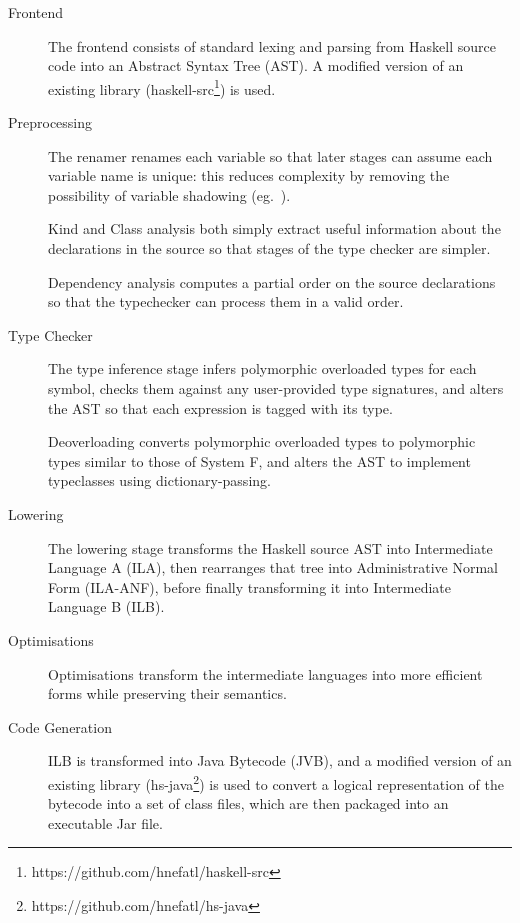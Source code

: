 \documentclass[dissertation.tex]{subfiles}
\begin{document}
\begin{description}
\item[Frontend]
{
    \hfill

    The frontend consists of standard lexing and parsing from Haskell source code into an Abstract Syntax Tree
    (AST). A modified version of an existing library (haskell-src\footnote{https://github.com/hnefatl/haskell-src})
    is used.

}
\item[Preprocessing]
{
    \hfill

    The renamer renames each variable so that later stages can assume each variable name is unique: this reduces
    complexity by removing the possibility of variable shadowing (eg.\ ).

    Kind and Class analysis both simply extract useful information about the declarations in the source so that stages
    of the type checker are simpler.

    Dependency analysis computes a partial order on the source declarations so that the typechecker can process them in
    a valid order.

}
\item[Type Checker]
{
    \hfill

    The type inference stage infers polymorphic overloaded types for each symbol, checks them against any user-provided
    type signatures, and alters the AST so that each expression is tagged with its type.

    Deoverloading converts polymorphic overloaded types to polymorphic types similar to those of System F, and alters
    the AST to implement typeclasses using dictionary-passing.

}
\item[Lowering]
{
    \hfill

    The lowering stage transforms the Haskell source AST into Intermediate Language A (ILA), then rearranges that tree
    into Administrative Normal Form (ILA-ANF), before finally transforming it into Intermediate Language B (ILB).

}
\item[Optimisations]
{
    \hfill

    Optimisations transform the intermediate languages into more efficient forms while preserving their semantics.


}
\item[Code Generation]
{
    \hfill

    ILB is transformed into Java Bytecode (JVB), and a modified version of an existing library
    (hs-java\footnote{https://github.com/hnefatl/hs-java}) is used to convert a logical representation of the bytecode
    into a set of class files, which are then packaged into an executable Jar file.

}
\end{description}
\end{document}
